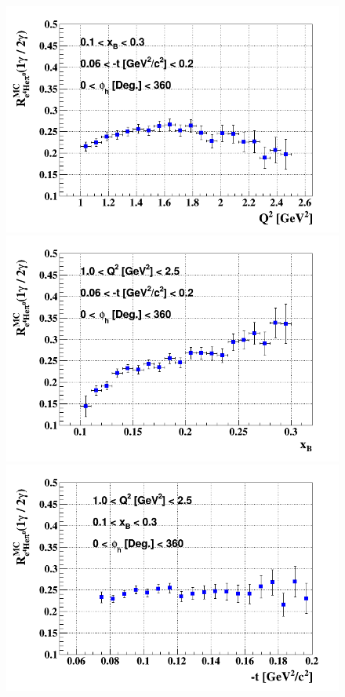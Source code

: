 \begin{figure}[tpb]
\centering
\includegraphics[scale=0.30]{fig_dvcs/e4Hegamma_e4Hepi0_Q2.png}
\includegraphics[scale=0.30]{fig_dvcs/e4Hegamma_e4Hepi0_xB.png}
\includegraphics[scale=0.30]{fig_dvcs/e4Hegamma_e4Hepi0_t.png}

\end{figure}

